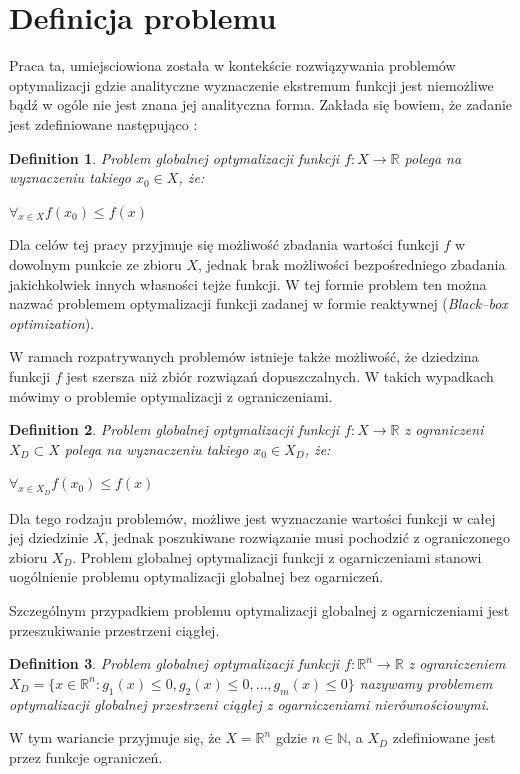 \documentclass[11pt,a4paper]{report}
\begin{document}
\section{Definicja problemu}
\par{
Praca ta, umiejsciowiona została w kontekście rozwiązywania problemów optymalizacji gdzie analityczne wyznaczenie ekstremum funkcji jest niemożliwe bądź w ogóle nie jest znana jej analityczna forma. Zakłada się bowiem, że zadanie jest zdefiniowane następująco \cite{StrojnowskiOptymalizacja2}:
}
\newtheorem{OptDefinition}{Definition}
\par{
\begin{OptDefinition}
Problem globalnej optymalizacji funkcji $f: X \rightarrow \mathbb{R}$ polega na wyznaczeniu takiego $x_0 \in X$, że:
\begin{center}
	$\forall_{x \in X} f(x_0) \leq f(x)$
\end{center}
\end{OptDefinition}
\par{
Dla celów tej pracy przyjmuje się możliwość zbadania wartości funkcji $f$ w dowolnym punkcie ze zbioru $X$, jednak brak możliwości bezpośredniego zbadania jakichkolwiek innych własności tejże funkcji. W tej formie problem ten można nazwać problemem optymalizacji funkcji zadanej w formie reaktywnej (\emph{Black--box optimization}).
}
\par{
W ramach rozpatrywanych problemów istnieje także możliwość, że dziedzina funkcji $f$ jest szersza niż zbiór rozwiązań dopuszczalnych. W takich wypadkach mówimy o problemie optymalizacji z ograniczeniami.
\begin{OptDefinition}
Problem globalnej optymalizacji funkcji $f: X \rightarrow \mathbb{R}$ z ograniczeni $X_D \subset X$ polega na wyznaczeniu takiego $x_0 \in X_D$, że:
\begin{center}
	$\forall_{x \in X_D} f(x_0) \leq f(x)$
\end{center}
\end{OptDefinition}
Dla tego rodzaju problemów, możliwe jest wyznaczanie wartości funkcji w całej jej dziedzinie $X$, jednak poszukiwane rozwiązanie musi pochodzić z ograniczonego zbioru $X_D$.
Problem globalnej optymalizacji funkcji z ogarniczeniami stanowi uogólnienie problemu optymalizacji globalnej bez ogarniczeń.
}
\par{
Szczególnym przypadkiem problemu optymalizacji globalnej z ogarniczeniami jest przeszukiwanie przestrzeni ciągłej. 
\begin{OptDefinition}
Problem globalnej optymalizacji funkcji $f: \mathbb{R}^n \rightarrow \mathbb{R}$ z ograniczeniem $X_D = \{x \in \mathbb{R}^n: g_1(x) \leq 0, g_2(x) \leq 0, \ldots, g_m(x) \leq 0\}$ nazywamy problemem optymalizacji globalnej przestrzeni ciągłej z ogarniczeniami nierównościowymi.
\end{OptDefinition}
W tym wariancie przyjmuje się, że $X = \mathbb{R}^n$ gdzie $n \in \mathbb{N}$, a $X_D$ zdefiniowane jest przez funkcje ograniczeń.
}

}
\end{document}
